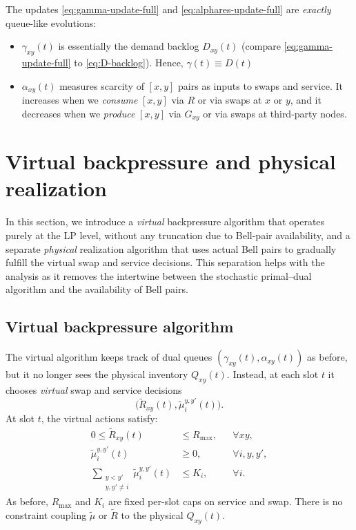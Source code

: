 \documentclass[11pt]{article}
\newtheorem{remark}{Remark}
\begin{document}


The updates \eqref{eq:gamma-update-full} and \eqref{eq:alphares-update-full} are \emph{exactly} queue-like evolutions:
\begin{itemize}[leftmargin=2em]
\item $\gamma_{xy}(t)$ is essentially the demand backlog $D_{xy}(t)$ (compare \eqref{eq:gamma-update-full} to \eqref{eq:D-backlog}). Hence, $\gamma(t) \equiv D(t)$ 
\item $\alpha_{xy}(t)$ measures scarcity of $[x,y]$ pairs as inputs to swaps and service. It increases when we \emph{consume} $[x,y]$ via $R$ or via swaps at $x$ or $y$, and it decreases when we \emph{produce} $[x,y]$ via $G_{xy}$ or via swaps at third-party nodes.
\end{itemize}


\section{Virtual backpressure and physical realization}
\label{sec:virtual-physical}

In this section, we introduce a \emph{virtual}
backpressure algorithm that operates purely at the LP level, without any truncation due to
Bell-pair availability, and a separate \emph{physical} realization algorithm that uses actual
Bell pairs to gradually fulfill the virtual swap and service decisions. This separation helps with the analysis as it removes the intertwine between the stochastic
primal--dual algorithm and the availability of Bell pairs.

\subsection{Virtual backpressure algorithm}

The virtual algorithm keeps track of dual queues $(\gamma_{xy}(t),\alpha_{xy}(t))$ as before,
but it no longer sees the physical inventory $Q_{xy}(t)$.
Instead, at each slot $t$ it chooses \emph{virtual} swap and service decisions
\[
\bigl(\tilde R_{xy}(t),\tilde\mu_i^{y,y'}(t)\bigr).
\]
At slot $t$, the virtual actions satisfy:
\begin{align}
0 \le \tilde R_{xy}(t) &\le {R}_{\max},
&& \forall xy, \label{eq:virt-R-cap}\\
\tilde\mu_i^{y,y'}(t) &\ge 0,
&& \forall i,y,y', \label{eq:virt-mu-nonneg}\\
\sum_{\substack{y<y'\\ y,y'\neq i}} \tilde\mu_i^{y,y'}(t)
&\le K_i, && \forall i. \label{eq:virt-node-cap}
\end{align}
As before, $R_{\max}$ and $K_i$ are fixed per-slot caps on service and swap. There is no constraint coupling $\tilde\mu$ or $\tilde R$ to the
physical $Q_{xy}(t)$.
\end{document}
